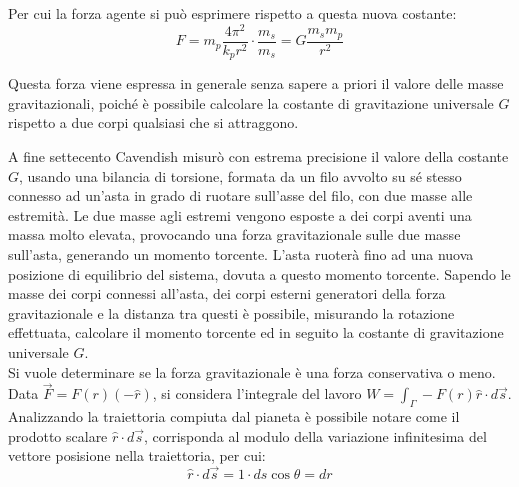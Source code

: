 \documentclass{article}
\numberwithin{equation}{subsection}
\begin{document}
Per cui la forza agente si può esprimere rispetto a questa nuova costante:
\begin{equation}
    F=m_p\displaystyle\frac{4\pi^2}{k_pr^2}\cdot\frac{m_s}{m_s}=G\frac{m_sm_p}{r^2}
\end{equation}

Questa forza viene espressa in generale senza sapere a priori il valore delle masse gravitazionali, poiché è possibile calcolare la costante di gravitazione universale $G$ 
rispetto a due corpi qualsiasi che si attraggono. 


A fine settecento Cavendish misurò con estrema precisione il valore della costante $G$, usando una bilancia di torsione, formata da un filo avvolto 
su sé stesso connesso ad un'asta in grado di ruotare sull'asse del filo, con due masse alle estremità. Le due masse agli estremi vengono esposte 
a dei corpi aventi una massa molto elevata, provocando una forza gravitazionale sulle due masse sull'asta, generando un momento torcente. L'asta ruoterà fino ad una nuova 
posizione di equilibrio del sistema, dovuta a questo momento torcente. Sapendo le masse dei corpi connessi all'asta, dei corpi esterni generatori della forza 
gravitazionale e la distanza tra questi è possibile, misurando la rotazione effettuata, calcolare il momento torcente ed in seguito la costante di gravitazione universale $G$. 
\\
Si vuole determinare se la forza gravitazionale è una forza conservativa o meno. 
Data $\vec{F}=F(r)(-\hat{r})$, si considera l'integrale del lavoro $W=\displaystyle\int_{\Gamma}-F(r)\hat{r}\cdot d\vec{s}$. Analizzando  
la traiettoria compiuta dal pianeta è possibile notare come il prodotto scalare $\hat{r}\cdot d\vec{s}$, corrisponda al modulo della variazione 
infinitesima del vettore posisione nella traiettoria, per cui:
\begin{equation*}
    \hat{r}\cdot d\vec{s}=1\cdot ds\cos\theta=dr
\end{equation*}

\begin{center}
\end{center}
\end{document}
